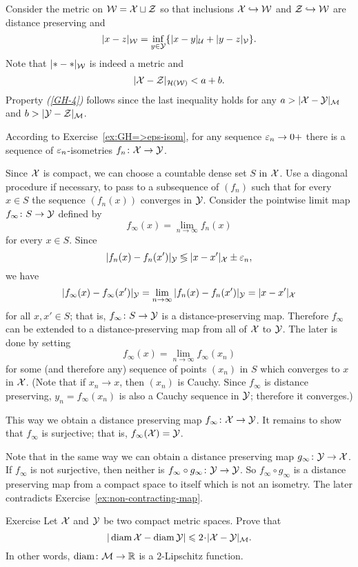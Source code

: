 Consider the metric on $\mathcal{W}=\mathcal{X}\sqcup \mathcal{Z}$ 
so that inclusions $\mathcal{X}\hookrightarrow \mathcal{W}$ and $\mathcal{Z}\hookrightarrow \mathcal{W}$ are distance preserving
and 
$$|x-z|_{\mathcal{W}}=\inf_{y\in \mathcal{Y}}\{|x-y|_{\mathcal{U}}+|y-z|_{\mathcal{V}}\}.$$
Note that $|{*}-{*}|_{\mathcal{W}}$ is indeed a metric and 
$$|\mathcal{X}-\mathcal{Z}|_{\mathcal{H}(\mathcal{W})}<a+b.$$
Property {\it (\ref{GH-4})} follows since the last inequality holds for any $a>|\spc{X}\z-\spc{Y}|_{\spc{M}}$ and $b>|\mathcal{Y}-\mathcal{Z}|_{\mathcal{M}}$.


According to Exercise~\ref{ex:GH=>eps-isom},
for any sequence $\varepsilon_n\to0+$ there is a sequence of $\varepsilon_n$-isometries 
$f_n\colon\mathcal{X}\to \mathcal{Y}$.

Since $\mathcal{X}$ is compact, 
we can choose a countable dense set
$S$ in $\mathcal{X}$.
Use a diagonal procedure if necessary, to pass to a subsequence of $(f_n)$
such that for every $x \in S$ the sequence $(f_n(x))$ 
converges in $\mathcal{Y}$. 
Consider the pointwise limit map  $f_\infty \colon S \to \mathcal{Y}$ defined by
 $$f_\infty(x) = \lim_{n\to\infty} f_n (x)$$ for every $x \in S$. 
Since $$|f_n (x)- f_n (x')|_{\mathcal{Y}}\lessgtr |x- x'|_{\mathcal{X}} \pm\varepsilon_n,$$ 
we have 
$$|f_\infty(x)-f_\infty (x')|_{\mathcal{Y}} 
= \lim_{n\to\infty} |f_n(x)-f_n (x')|_{\mathcal{Y}} 
= |x -x'|_{\mathcal{X}}$$ for all
$x, x' \in S$; 
that is, $f_\infty\colon S\to \mathcal{Y}$ is a distance-preserving map. 
Therefore $f_\infty$ can be extended to a distance-preserving map from all of $\mathcal{X}$ to $\mathcal{Y}$.
The later is done by setting 
$$f_\infty(x)=\lim_{n\to\infty} f_\infty(x_n)$$ 
for some (and therefore any) sequence of points $(x_n)$ in $S$
which converges to $x$ in $\mathcal{X}$.
(Note that if $x_n\to x$, then $(x_n)$ is Cauchy.
Since $f_\infty$ is distance preserving, $y_n=f_\infty(x_n)$ is also a Cauchy sequence in $\mathcal{Y}$;
therefore it converges.)

This way we obtain a distance preserving map $f_\infty\colon\mathcal{X}\to \mathcal{Y}$. 
It remains to show that $f_\infty$ is surjective; that is, $f_\infty(\mathcal{X})=\mathcal{Y}$.

Note that in the same way we can obtain a distance preserving map $g_\infty\:\spc{Y}\z\to \spc{X}$.
If $f_\infty$ is not surjective, then neither is $f_\infty\circ g_\infty\colon\mathcal{Y}\to \mathcal{Y}$.
So $f_\infty \circ g_\infty$ is a distance preserving map from a compact space to itself which is not an isometry.
The later contradicts Exercise~\ref{ex:non-contracting-map}. 
\qeds

\begin{thm}{Exercise}\label{ex:d_GH-and-diam}
 Let $\mathcal{X}$ and $\mathcal{Y}$ be two compact metric spaces.
Prove that 
$$|\diam \spc{X} - \diam \spc{Y} |\le 2\cdot |\spc{X}-\spc{Y}|_{\spc{M}}.$$
In other words, $\operatorname{\rm diam}\nolimits\colon\mathcal{M}\to\mathbb{R}$ is a $2$-Lipschitz function.
\end{thm}

